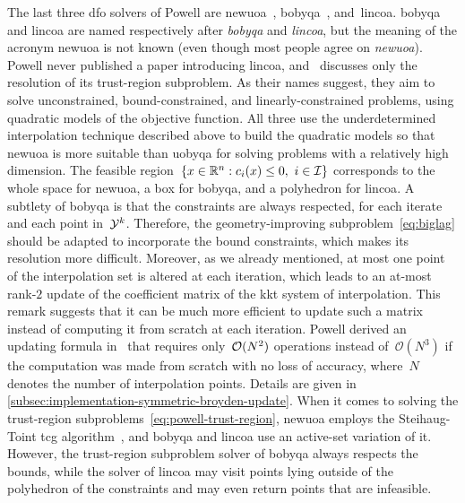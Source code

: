 The last three \gls{dfo} solvers of Powell are \gls{newuoa}~\cite{Powell_2006, Powell_2008}, \gls{bobyqa}~\cite{Powell_2009}, and~\gls{lincoa}.
\Gls{bobyqa} and \gls{lincoa} are named respectively after \emph{\glsdesc{bobyqa}} and \emph{\glsdesc{lincoa}}, but the meaning of the acronym \gls{newuoa} is not known (even though most people agree on \emph{\glsdesc{newuoa}}).
Powell never published a paper introducing \gls{lincoa}, and~\cite{Powell_2015} discusses only the resolution of its trust-region subproblem.
As their names suggest, they aim to solve unconstrained, bound-constrained, and linearly-constrained problems, using quadratic models of the objective function.
All three use the underdetermined interpolation technique described above to build the quadratic models so that \gls{newuoa} is more suitable than \gls{uobyqa} for solving problems with a relatively high dimension.
The feasible region~$\set{\iter \in \R^n : \con{i}(\iter) \le 0, ~ i \in \iub}$ corresponds to the whole space for \gls{newuoa}, a box for \gls{bobyqa}, and a polyhedron for \gls{lincoa}.
A subtlety of \gls{bobyqa} is that the constraints are always respected, for each iterate and each point in~$\xpt[k]$.
Therefore, the geometry-improving subproblem~\cref{eq:biglag} should be adapted to incorporate the bound constraints, which makes its resolution more difficult.
Moreover, as we already mentioned, at most one point of the interpolation set is altered at each iteration, which leads to an at-most rank-$2$ update of the coefficient matrix of the \gls{kkt} system of interpolation.
This remark suggests that it can be much more efficient to update such a matrix instead of computing it from scratch at each iteration.
Powell derived an updating formula in~\cite{Powell_2004b} that requires only~$\operatorname{\mathcal{O}}(N^2)$ operations instead of~$\mathcal{O}(N^3)$ if the computation was made from scratch with no loss of accuracy, where~$N$ denotes the number of interpolation points.
Details are given in \cref{subsec:implementation-symmetric-broyden-update}.
When it comes to solving the trust-region subproblems~\cref{eq:powell-trust-region}, \gls{newuoa} employs the Steihaug-Toint \gls{tcg} algorithm~\cite{Steihaug_1983,Toint_1981}, and \gls{bobyqa} and \gls{lincoa} use an active-set variation of it.
However, the trust-region subproblem solver of \gls{bobyqa} always respects the bounds, while the solver of \gls{lincoa} may visit points lying outside of the polyhedron of the constraints and may even return points that are infeasible.

